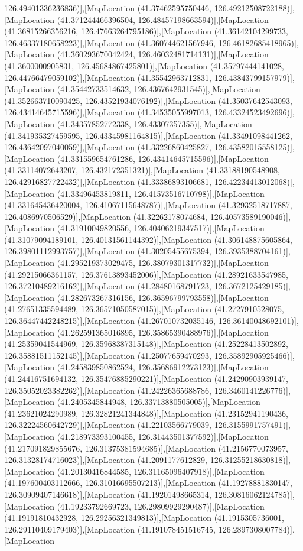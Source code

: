 126.49401336236836)],[MapLocation (41.37462595750446, 126.49212508722188)],[MapLocation (41.371244466396504, 126.48457198663594)],[MapLocation (41.36815266356216, 126.47663264795186)],[MapLocation (41.36142104299733, 126.46337180658223)],[MapLocation (41.360744621567946, 126.46182685418965)],[MapLocation (41.360293670042424, 126.46032481714131)],[MapLocation (41.3600000905831, 126.45684867425801)],[MapLocation (41.35797444141028, 126.44766479059102)],[MapLocation (41.35542963712831, 126.43843799157979)],[MapLocation (41.35442733514632, 126.4367642931545)],[MapLocation (41.352663710090425, 126.43521934076192)],[MapLocation (41.35037642543093, 126.43414645715596)],[MapLocation (41.34535055997013, 126.43324523492696)],[MapLocation (41.34357852772338, 126.43307357355)],[MapLocation (41.341935327459595, 126.43345981164815)],[MapLocation (41.33491098441262, 126.43642097040059)],[MapLocation (41.33226860425827, 126.43582015558125)],[MapLocation (41.331559654761286, 126.43414645715596)],[MapLocation (41.33114072643207, 126.432172351321)],[MapLocation (41.33188190548908, 126.42916827722432)],[MapLocation (41.33386893106681, 126.42234413012068)],[MapLocation (41.33496453819811, 126.41573516710798)],[MapLocation (41.331645436420004, 126.41067115648787)],[MapLocation (41.32932518717887, 126.4086970506529)],[MapLocation (41.32262178074684, 126.40573589190046)],[MapLocation (41.31910049820556, 126.40406219347517)],[MapLocation (41.31079094189101, 126.40131561144392)],[MapLocation (41.306148875605864, 126.39801112993757)],[MapLocation (41.30205455675394, 126.3935388704161)],[MapLocation (41.295219373029475, 126.38079301317732)],[MapLocation (41.29215066361157, 126.37613893452006)],[MapLocation (41.28921633547985, 126.37210489216162)],[MapLocation (41.28480168791723, 126.3672125429185)],[MapLocation (41.282673267316156, 126.36596799793558)],[MapLocation (41.27651335594489, 126.36571050587015)],[MapLocation (41.2727910528075, 126.36447442248215)],[MapLocation (41.267010732035146, 126.36140048692101)],[MapLocation (41.262591365016895, 126.35865390488976)],[MapLocation (41.25359041544969, 126.35968387315148)],[MapLocation (41.25228413502892, 126.35881511152145)],[MapLocation (41.25077659470293, 126.35892905925466)],[MapLocation (41.245839850862524, 126.35686912273123)],[MapLocation (41.24416751694132, 126.35476885290221)],[MapLocation (41.24290903939147, 126.35052023382262)],[MapLocation (41.24226365688786, 126.3460141226776)],[MapLocation (41.2405345844948, 126.33713880505005)],[MapLocation (41.23621024290989, 126.32821241344848)],[MapLocation (41.23152941190436, 126.32224560642729)],[MapLocation (41.22103566779039, 126.3155991757491)],[MapLocation (41.218973393100455, 126.31443501377592)],[MapLocation (41.217091829855676, 126.31375381594685)],[MapLocation (41.2156770073957, 126.31328174716023)],[MapLocation (41.2091177612829, 126.31255218630818)],[MapLocation (41.20130416844585, 126.31165096407918)],[MapLocation (41.197600403112666, 126.31016695507213)],[MapLocation (41.19278881830147, 126.30909407146618)],[MapLocation (41.19201498665314, 126.30816062124785)],[MapLocation (41.19233792669723, 126.29809929290487)],[MapLocation (41.19191810432928, 126.29256321349813)],[MapLocation (41.1915305736001, 126.29110409179403)],[MapLocation (41.191078451516745, 126.2897308007784)],[MapLocation 